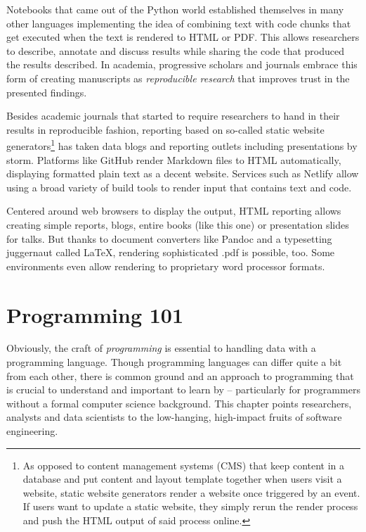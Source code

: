 \documentclass[
  12pt,
  letterpaper,
]{krantz}
\begin{document}
Notebooks that came out of the Python world established themselves in
many other languages implementing the idea of combining text with code
chunks that get executed when the text is rendered to HTML
or PDF. This allows researchers to describe, annotate and discuss
results while sharing the code that produced the results described. In
academia, progressive scholars and journals embrace this form of
creating manuscripts as \emph{reproducible research} that improves trust
in the presented findings.

Besides academic journals that started to require researchers to hand in
their results in reproducible fashion, reporting based on so-called
static website generators\footnote{As opposed to content management
  systems (CMS) that keep content in a database and put
  content and layout template together when users visit a website,
  static website generators render a website once triggered by an event.
  If users want to update a static website, they simply rerun the render
  process and push the HTML output of said process online.} has taken
data blogs and reporting outlets including presentations by storm.
Platforms like GitHub render Markdown files to HTML automatically,
displaying formatted plain text as a decent website. Services such as
Netlify allow using a broad variety of build tools to render input that
contains text and code.

Centered around web browsers to display the output, HTML
reporting allows creating simple reports, blogs, entire
books (like this one) or presentation slides for talks. But thanks to
document converters like Pandoc and a typesetting juggernaut called
LaTeX, rendering sophisticated .pdf is possible, too. Some environments
even allow rendering to proprietary word processor formats.


\hypertarget{programming-101}{%
\chapter{Programming 101}\label{programming-101}}

Obviously, the craft of \emph{programming} is essential to handling data
with a programming language. Though programming languages can differ
quite a bit from each other, there is common ground and an approach to
programming that is crucial to understand and important to learn by --
particularly for programmers without a formal computer science
background. This chapter points researchers, analysts and data
scientists to the low-hanging, high-impact fruits of software
engineering.
\end{document}
